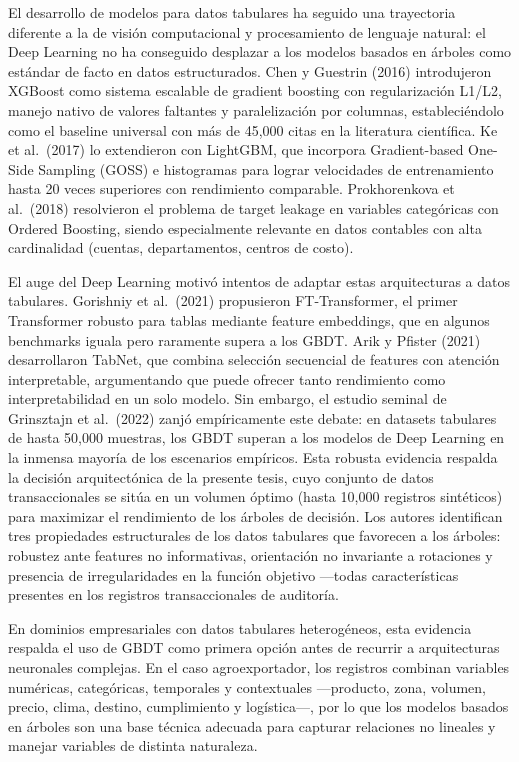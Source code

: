El desarrollo de modelos para datos tabulares ha seguido una trayectoria
diferente a la de visión computacional y procesamiento de lenguaje
natural: el Deep Learning no ha conseguido desplazar a los modelos
basados en árboles como estándar de facto en datos estructurados. Chen y
Guestrin (2016) introdujeron XGBoost como sistema escalable de gradient
boosting con regularización L1/L2, manejo nativo de valores faltantes y
paralelización por columnas, estableciéndolo como el baseline universal
con más de 45,000 citas en la literatura científica. Ke et al.~(2017) lo
extendieron con LightGBM, que incorpora Gradient-based One-Side Sampling
(GOSS) e histogramas para lograr velocidades de entrenamiento hasta 20
veces superiores con rendimiento comparable. Prokhorenkova et al.~(2018)
resolvieron el problema de target leakage en variables categóricas con
Ordered Boosting, siendo especialmente relevante en datos contables con
alta cardinalidad (cuentas, departamentos, centros de costo).

El auge del Deep Learning motivó intentos de adaptar estas arquitecturas
a datos tabulares. Gorishniy et al.~(2021) propusieron FT-Transformer,
el primer Transformer robusto para tablas mediante feature embeddings,
que en algunos benchmarks iguala pero raramente supera a los GBDT. Arik
y Pfister (2021) desarrollaron TabNet, que combina selección secuencial
de features con atención interpretable, argumentando que puede ofrecer
tanto rendimiento como interpretabilidad en un solo modelo. Sin embargo,
el estudio seminal de Grinsztajn et al.~(2022) zanjó empíricamente este
debate: en datasets tabulares de hasta 50,000 muestras, los GBDT superan
a los modelos de Deep Learning en la inmensa mayoría de los escenarios
empíricos. Esta robusta evidencia respalda la decisión arquitectónica de
la presente tesis, cuyo conjunto de datos transaccionales se sitúa en un
volumen óptimo (hasta 10,000 registros sintéticos) para maximizar el
rendimiento de los árboles de decisión. Los autores identifican tres
propiedades estructurales de los datos tabulares que favorecen a los
árboles: robustez ante features no informativas, orientación no
invariante a rotaciones y presencia de irregularidades en la función
objetivo ---todas características presentes en los registros
transaccionales de auditoría.

En dominios empresariales con datos tabulares heterogéneos, esta
evidencia respalda el uso de GBDT como primera opción antes de recurrir
a arquitecturas neuronales complejas. En el caso agroexportador, los
registros combinan variables numéricas, categóricas, temporales y
contextuales ---producto, zona, volumen, precio, clima, destino,
cumplimiento y logística---, por lo que los modelos basados en árboles
son una base técnica adecuada para capturar relaciones no lineales y
manejar variables de distinta naturaleza.

